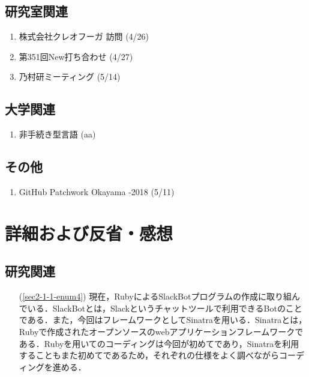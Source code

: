 \documentclass[fleqn, 14pt]{extarticle}
\begin{document}
\subsection{研究室関連}
\label{sec2-2}
\begin{enumerate}
\item 株式会社クレオフーガ 訪問
  \hfill
  \label{sec2-2-enum1}
  (4/26)
\item 第351回New打ち合わせ
  \hfill
  \label{sec2-2-enum2}
  (4/27)
\item 乃村研ミーティング
  \hfill
  \label{sec2-2-enum3}
  (5/14)
\end{enumerate}

\subsection{大学関連}
\label{sec2-3}
\begin{enumerate}
\item 非手続き型言語
  \hfill
  \label{sec2-3-enum1}
  (aa)
\end{enumerate}

\subsection{その他}
\label{sec2-4}
\begin{enumerate}
\item GitHub Patchwork Okayama -2018
  \hfill
  \label{sec2-4-enum1}
  (5/11)
\end{enumerate}

\section{詳細および反省・感想}
\label{sec3}
\subsection{研究関連}
\label{sec3-1}
\begin{itemize}
\item[(\ref{sec2-1-1-enum4})] 現在，RubyによるSlackBotプログラムの作成に取り組んでいる．SlackBotとは，Slackというチャットツールで利用できるBotのことである．また，今回はフレームワークとしてSinatraを用いる．Sinatraとは，Rubyで作成されたオープンソースのwebアプリケーションフレームワークである．Rubyを用いてのコーディングは今回が初めてであり，Sinatraを利用することもまた初めてであるため，それぞれの仕様をよく調べながらコーディングを進める．
\end{itemize}
\end{document}
